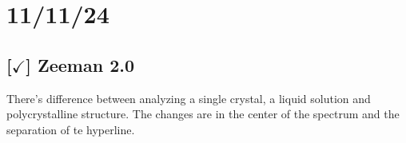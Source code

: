 \section{11/11/24}

\subsection{[$\checkmark$] Zeeman 2.0}

There's difference between analyzing a single crystal, a liquid solution and polycrystalline structure. The changes are in the center of the spectrum and the separation of te hyperline.